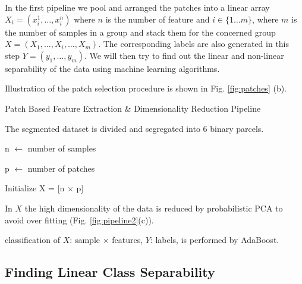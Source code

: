 In the first pipeline we pool and arranged the patches into a linear array $ X_i = (x^1_i,\dots,x^n_i) $ where $ n $ is the number of feature and $ i \in \{1 \dots m\} $, where $ m $ is the number of samples in a group and stack them for the concerned group $ X = (X_1,\dots,X_i,\dots,X_m) $. The corresponding labels are also generated in this step $ Y = (y_1,\dots,y_m) $. We will then try to find out the linear and non-linear separability of the data using machine learning algorithms.

Illustration of the patch selection procedure is shown in Fig. \ref{fig:patches} (b).

\begin{algorithm}
	\vspace{1em}
	\caption{Patch Based Feature Extraction \& Dimensionality Reduction Pipeline}\label{alg:pipeline2}
	
	
	
	The segmented dataset is divided and segregated into 6 binary parcels.
	
	 {
		
		n $ \gets $ number of samples
		
		p $ \gets $ number of patches
		
		Initialize X = [n $ \times $ p]
		
		
		In $ X $ the high dimensionality of the data is reduced by probabilistic PCA to avoid over fitting (Fig. \ref{fig:pipeline2}(c)).
		
		classification of $ X $: sample $ \times $ features, $ Y $: labels, is performed by AdaBoost. 
	}
\end{algorithm}


\subsection{Finding Linear Class Separability}
\label{sec:dicsriminant_analysis}


